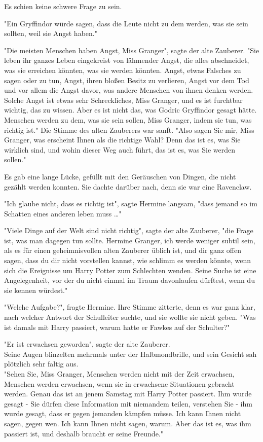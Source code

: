 {Es schien keine schwere Frage zu sein.

"Ein Gryffindor würde sagen, dass die Leute nicht zu dem werden, was sie sein sollten, weil sie Angst haben."

"Die meisten Menschen haben Angst, Miss Granger", sagte der alte Zauberer. "Sie leben ihr ganzes Leben eingekreist von lähmender Angst, die alles abschneidet, was sie erreichen könnten, was sie werden könnten. Angst, etwas Falsches zu sagen oder zu tun, Angst, ihren bloßen Besitz zu verlieren, Angst vor dem Tod und vor allem die Angst davor, was andere Menschen von ihnen denken werden. Solche Angst ist etwas sehr Schreckliches, Miss Granger, und es ist furchtbar wichtig, das zu wissen. Aber es ist nicht das, was Godric Gryffindor gesagt hätte. Menschen werden zu dem, was sie sein sollen, Miss Granger, indem sie tun, was richtig ist." Die Stimme des alten Zauberers war sanft. "Also sagen Sie mir, Miss Granger, was erscheint Ihnen als die richtige Wahl? Denn das ist es, was Sie wirklich sind, und wohin dieser Weg auch führt, das ist es, was Sie werden sollen."

Es gab eine lange Lücke, gefüllt mit den Geräuschen von Dingen, die nicht gezählt werden konnten. Sie dachte darüber nach, denn sie war eine Ravenclaw.

"Ich glaube nicht, dass es richtig ist", sagte Hermine langsam, "dass jemand so im Schatten eines anderen leben muss …"

"Viele Dinge auf der Welt sind nicht richtig", sagte der alte Zauberer, "die Frage ist, was man dagegen tun sollte. Hermine Granger, ich werde weniger subtil sein, als es für einen geheimnisvollen alten Zauberer üblich ist, und dir ganz offen sagen, dass du dir nicht vorstellen kannst, wie schlimm es werden könnte, wenn sich die Ereignisse um Harry Potter zum Schlechten wenden. Seine Suche ist eine Angelegenheit, vor der du nicht einmal im Traum davonlaufen dürftest, wenn du sie kennen würdest."

"Welche Aufgabe?", fragte Hermine. Ihre Stimme zitterte, denn es war ganz klar, nach welcher Antwort der Schulleiter suchte, und sie wollte sie nicht geben. "Was ist damals mit Harry passiert, warum hatte er Fawkes auf der Schulter?"

"Er ist erwachsen geworden", sagte der alte Zauberer.\\ Seine Augen blinzelten mehrmals unter der Halbmondbrille, und sein Gesicht sah plötzlich sehr faltig aus.\\ "Sehen Sie, Miss Granger, Menschen werden nicht mit der Zeit erwachsen, Menschen werden erwachsen, wenn sie in erwachsene Situationen gebracht werden. Genau das ist an jenem Samstag mit Harry Potter passiert. Ihm wurde gesagt - Sie dürfen diese Information mit niemandem teilen, verstehen Sie - ihm wurde gesagt, dass er gegen jemanden kämpfen müsse. Ich kann Ihnen nicht sagen, gegen wen. Ich kann Ihnen nicht sagen, warum. Aber das ist es, was ihm passiert ist, und deshalb braucht er seine Freunde."

}
